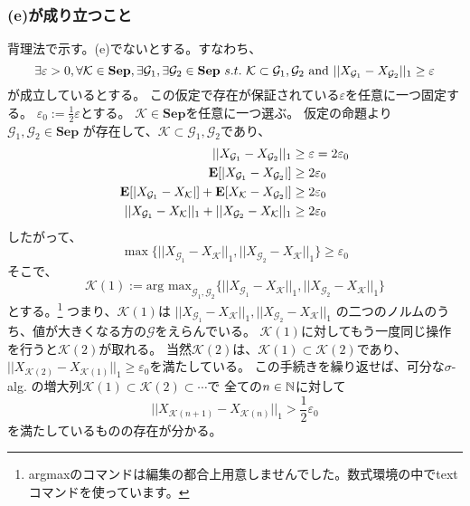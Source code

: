     \subsubsection{(e)が成り立つこと}
      背理法で示す。(e)でないとする。すなわち、
      \[
        \exists \varepsilon > 0 ,\forall \mathcal{K} \in \mathbf{Sep},\exists \mathcal{G}_1,\exists\mathcal{G}_2 \in \mathbf{Sep} \,\, s.t. \,\, \mathcal{K} \subset \mathcal{G}_1,\mathcal{G}_2 \text{\,\,and\,\,} ||X_{\mathcal{G}_1} - X_{\mathcal{G}_2}||_1 \ge \varepsilon
      \]
      が成立しているとする。
      この仮定で存在が保証されている$\varepsilon$を任意に一つ固定する。
      $\varepsilon_0 := \frac{1}{2}\varepsilon$とする。
      $\mathcal{K} \in \mathbf{Sep}$を任意に一つ選ぶ。
      仮定の命題より$\mathcal{G}_1, \mathcal{G}_2 \in \mathbf{Sep}$
      が存在して、$\mathcal{K} \subset \mathcal{G}_1,\mathcal{G}_2$であり、
      \begin{align*}
        ||X_{\mathcal{G}_1} - X_{\mathcal{G}_2}||_1 &\ge \varepsilon = 2\varepsilon_0\\
        {\mathbf{E}}[|X_{\mathcal{G}_1} - X_{\mathcal{G}_2}|] &\ge 2\varepsilon_0\\
        {\mathbf{E}}[|X_{\mathcal{G}_1} - X_{\mathcal{K}}|] + {\mathbf{E}}[ X_{\mathcal{K}} - X_{\mathcal{G}_2}|] &\ge 2\varepsilon_0\\
        ||X_{\mathcal{G}_1} - X_{\mathcal{K}}||_1 + ||X_{\mathcal{G}_2} - X_{\mathcal{K}}||_1 &\ge 2\varepsilon_0
      \end{align*}
      したがって、
      \[
        \max \{||X_{\mathcal{G}_1} - X_{\mathcal{K}}||_1, ||X_{\mathcal{G}_2} - X_{\mathcal{K}}||_1\} \ge \varepsilon_0
      \]
      そこで、
      \[
        \mathcal{K}(1) := \text{arg max}_{\mathcal{G}_1,\mathcal{G}_2} \{||X_{\mathcal{G}_1} - X_{\mathcal{K}}||_1, ||X_{\mathcal{G}_2} - X_{\mathcal{K}}||_1\}
      \]
      とする。\footnote{argmaxのコマンドは編集の都合上用意しませんでした。数式環境の中でtextコマンドを使っています。}
      つまり、$\mathcal{K}(1)$は
      $||X_{\mathcal{G}_1} - X_{\mathcal{K}}||_1, ||X_{\mathcal{G}_2} - X_{\mathcal{K}}||_1$
      の二つのノルムのうち、値が大きくなる方の$\mathcal{G}$をえらんでいる。
      $\mathcal{K}(1)$に対してもう一度同じ操作を行うと$\mathcal{K}(2)$が取れる。
      当然$\mathcal{K}(2)$は、$\mathcal{K}(1) \subset \mathcal{K}(2)$であり、
      $||X_{\mathcal{K}(2)} - X_{\mathcal{K}(1)}||_1 \ge \varepsilon_0$を満たしている。
      この手続きを繰り返せば、可分な$\sigma$-alg.
      の増大列$\mathcal{K}(1) \subset \mathcal{K}(2) \subset \cdots$で
      全ての$n \in {\mathbb{N}}$に対して
      \[
        ||X_{\mathcal{K}(n+1)} - X_{\mathcal{K}(n)}||_1 > \frac{1}{2}\varepsilon_0
      \]
      を満たしているものの存在が分かる。

